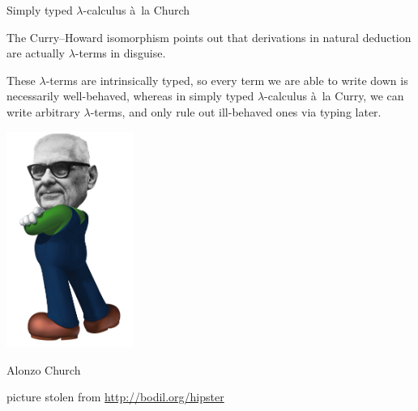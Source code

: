 \documentclass[t,compress,hyperref={hidelinks}]{beamer}
\begin{document}
\begin{frame}{Simply typed $\lambda$-calculus à~la Church}

The Curry--Howard isomorphism points out that derivations in natural deduction are actually $\lambda$-terms in disguise.

These $\lambda$-terms are intrinsically typed, so every term we are able to write down is necessarily well-behaved, whereas in simply typed $\lambda$-calculus à~la Curry, we can write arbitrary $\lambda$-terms, and only rule out ill-behaved ones via typing later.

\end{frame}

\addtocounter{framenumber}{-1}

\begin{frame}

\begin{center}

\vspace*{\fill}

\includegraphics[height=200pt]{church-luigi.png}

\color{OxfordOlive}\LARGE Alonzo Church

\vspace*{\fill}

\tiny\color{gray} picture stolen from \url{http://bodil.org/hipster}

\end{center}

\end{frame}

\addtocounter{framenumber}{-1}
\end{document}
